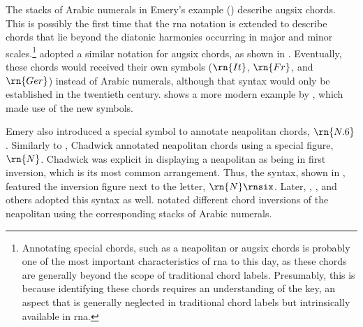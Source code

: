 


The stacks of Arabic numerals in Emery's example
() describe
\gls{augsix} chords. This is possibly the first time that
the \gls{rna} notation is extended to describe chords that
lie beyond the diatonic harmonies occurring in major and
minor scales.\footnote{Annotating special chords, such as a
\gls{neapolitan} or \gls{augsix} chords is probably one of
the most important characteristics of \gls{rna} to this day,
as these chords are generally beyond the scope of
traditional chord labels. Presumably, this is because
identifying these chords requires an understanding of the
key, an aspect that is generally neglected in traditional
chord labels but intrinsically available in \gls{rna}.}
\textcite{shepard1896harmony} adopted a similar notation for
\gls{augsix} chords, as shown in
. Eventually,
these chords would received their own symbols ($\rn{It}$,
$\rn{Fr}$, and $\rn{Ger}$) instead of Arabic numerals,
although that syntax would only be established in the
twentieth century.
 shows a more
modern example by \textcite{goldman1965harmony}, which made
use of the new symbols.



Emery also introduced a special symbol to annotate
\gls{neapolitan} chords, $\rn{N.6}$. Similarly to
\textcite{emery1879elements}, Chadwick annotated
\gls{neapolitan} chords using a special figure, $\rn{N}$.
Chadwick was explicit in displaying a \gls{neapolitan} as
being in first inversion, which is its most common
arrangement. Thus, the syntax, shown in
, featured
the inversion figure next to the letter, $\rn{N}\rnsix$.
Later, \textcite{heacox1907lessons},
\textcite{alchin1921applied}, and others adopted this syntax
as well. \textcite{heacox1907lessons} notated different
chord inversions of the \gls{neapolitan} using the
corresponding stacks of Arabic numerals.

